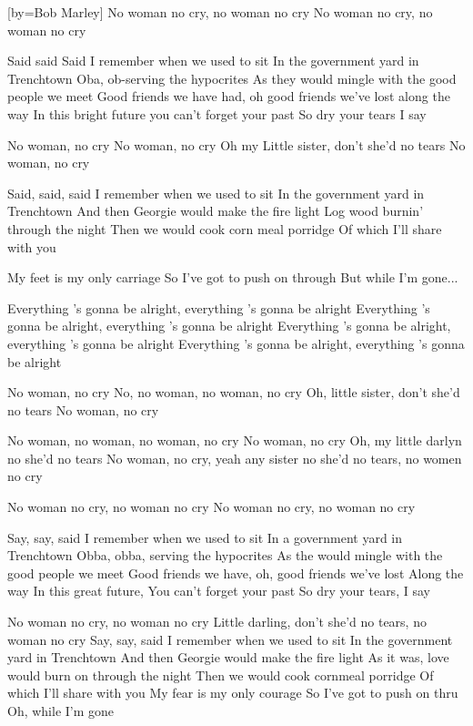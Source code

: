 [by={Bob Marley}]
\beginverse
No woman no cry, no woman no cry
No woman no cry, no woman no cry
\endverse

\beginverse
Said said
Said I remember when we used to sit
In the government yard in Trenchtown
Oba, ob-serving the hypocrites
As they would mingle with the good people we meet
Good friends we have had, oh good friends we've lost along the way
In this bright future you can't forget your past
So dry your tears I say
\endverse

\beginverse
No woman, no cry
No woman, no cry
Oh my Little sister, don't she'd no tears
No woman, no cry
\endverse

\beginverse
Said, said, said I remember when we used to sit
In the government yard in Trenchtown
And then Georgie would make the fire light
Log wood burnin' through the night
Then we would cook corn meal porridge
Of which I'll share with you
\endverse

\beginverse
My feet is my only carriage
So I've got to push on through
But while I'm gone...
\endverse

\beginverse
Everything 's gonna be alright, everything 's gonna be alright
Everything 's gonna be alright, everything 's gonna be alright
Everything 's gonna be alright, everything 's gonna be alright
Everything 's gonna be alright, everything 's gonna be alright
\endverse

\beginverse
No woman, no cry
No, no woman, no woman, no cry
Oh, little sister, don't she'd no tears
No woman, no cry
\endverse

\beginverse
No woman, no woman, no woman, no cry
No woman, no cry
Oh, my little darlyn no she'd no tears
No woman, no cry, yeah
any sister no she'd no tears, no women no cry
\endverse

\beginverse
No woman no cry, no woman no cry
No woman no cry, no woman no cry
\endverse

\beginverse
Say, say, said I remember when we used to sit
In a government yard in Trenchtown
Obba, obba, serving the hypocrites
As the would mingle with the good people we meet
Good friends we have, oh, good friends we've lost
Along the way
In this great future,
You can't forget your past
So dry your tears, I say
\endverse

\beginverse
No woman no cry, no woman no cry
Little darling, don't she'd no tears, no woman no cry
Say, say, said I remember when we used to sit
In the government yard in Trenchtown
And then Georgie would make the fire light
As it was, love would burn on through the night
Then we would cook cornmeal porridge
Of which I'll share with you
My fear is my only courage
So I've got to push on thru
Oh, while I'm gone
\endverse

